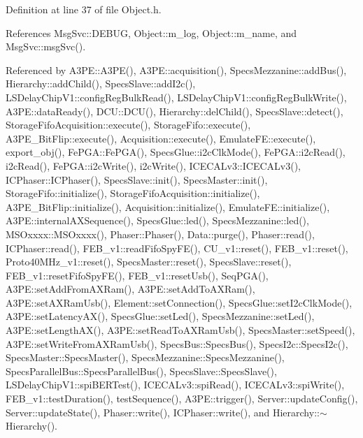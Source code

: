 Definition at line 37 of file Object.\+h.



References Msg\+Svc\+::\+D\+E\+B\+UG, Object\+::m\+\_\+log, Object\+::m\+\_\+name, and Msg\+Svc\+::msg\+Svc().



Referenced by A3\+P\+E\+::\+A3\+P\+E(), A3\+P\+E\+::acquisition(), Specs\+Mezzanine\+::add\+Bus(), Hierarchy\+::add\+Child(), Specs\+Slave\+::add\+I2c(), L\+S\+Delay\+Chip\+V1\+::config\+Reg\+Bulk\+Read(), L\+S\+Delay\+Chip\+V1\+::config\+Reg\+Bulk\+Write(), A3\+P\+E\+::data\+Ready(), D\+C\+U\+::\+D\+C\+U(), Hierarchy\+::del\+Child(), Specs\+Slave\+::detect(), Storage\+Fifo\+Acquisition\+::execute(), Storage\+Fifo\+::execute(), A3\+P\+E\+\_\+\+Bit\+Flip\+::execute(), Acquisition\+::execute(), Emulate\+F\+E\+::execute(), export\+\_\+obj(), Fe\+P\+G\+A\+::\+Fe\+P\+G\+A(), Specs\+Glue\+::i2c\+Clk\+Mode(), Fe\+P\+G\+A\+::i2c\+Read(), i2c\+Read(), Fe\+P\+G\+A\+::i2c\+Write(), i2c\+Write(), I\+C\+E\+C\+A\+Lv3\+::\+I\+C\+E\+C\+A\+Lv3(), I\+C\+Phaser\+::\+I\+C\+Phaser(), Specs\+Slave\+::init(), Specs\+Master\+::init(), Storage\+Fifo\+::initialize(), Storage\+Fifo\+Acquisition\+::initialize(), A3\+P\+E\+\_\+\+Bit\+Flip\+::initialize(), Acquisition\+::initialize(), Emulate\+F\+E\+::initialize(), A3\+P\+E\+::internal\+A\+X\+Sequence(), Specs\+Glue\+::led(), Specs\+Mezzanine\+::led(), M\+S\+Oxxxx\+::\+M\+S\+Oxxxx(), Phaser\+::\+Phaser(), Data\+::purge(), Phaser\+::read(), I\+C\+Phaser\+::read(), F\+E\+B\+\_\+v1\+::read\+Fifo\+Spy\+F\+E(), C\+U\+\_\+v1\+::reset(), F\+E\+B\+\_\+v1\+::reset(), Proto40\+M\+Hz\+\_\+v1\+::reset(), Specs\+Master\+::reset(), Specs\+Slave\+::reset(), F\+E\+B\+\_\+v1\+::reset\+Fifo\+Spy\+F\+E(), F\+E\+B\+\_\+v1\+::reset\+Usb(), Seq\+P\+G\+A(), A3\+P\+E\+::set\+Add\+From\+A\+X\+Ram(), A3\+P\+E\+::set\+Add\+To\+A\+X\+Ram(), A3\+P\+E\+::set\+A\+X\+Ram\+Usb(), Element\+::set\+Connection(), Specs\+Glue\+::set\+I2c\+Clk\+Mode(), A3\+P\+E\+::set\+Latency\+A\+X(), Specs\+Glue\+::set\+Led(), Specs\+Mezzanine\+::set\+Led(), A3\+P\+E\+::set\+Length\+A\+X(), A3\+P\+E\+::set\+Read\+To\+A\+X\+Ram\+Usb(), Specs\+Master\+::set\+Speed(), A3\+P\+E\+::set\+Write\+From\+A\+X\+Ram\+Usb(), Specs\+Bus\+::\+Specs\+Bus(), Specs\+I2c\+::\+Specs\+I2c(), Specs\+Master\+::\+Specs\+Master(), Specs\+Mezzanine\+::\+Specs\+Mezzanine(), Specs\+Parallel\+Bus\+::\+Specs\+Parallel\+Bus(), Specs\+Slave\+::\+Specs\+Slave(), L\+S\+Delay\+Chip\+V1\+::spi\+B\+E\+R\+Test(), I\+C\+E\+C\+A\+Lv3\+::spi\+Read(), I\+C\+E\+C\+A\+Lv3\+::spi\+Write(), F\+E\+B\+\_\+v1\+::test\+Duration(), test\+Sequence(), A3\+P\+E\+::trigger(), Server\+::update\+Config(), Server\+::update\+State(), Phaser\+::write(), I\+C\+Phaser\+::write(), and Hierarchy\+::$\sim$\+Hierarchy().


